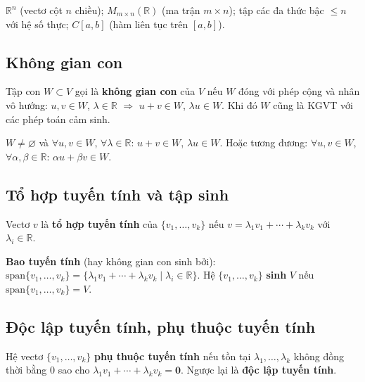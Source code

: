 \documentclass[12pt,a4paper]{article}
\begin{document}
\begin{vidu}
  $\mathbb{R}^n$ (vectơ cột $n$ chiều); $M_{m \times n}(\mathbb{R})$ (ma trận $m \times n$); tập các đa thức bậc $\le n$ với hệ số thực; $C[a,b]$ (hàm liên tục trên $[a,b]$).
\end{vidu}

\subsection{Không gian con}

\begin{dinhnghia}
  Tập con $W \subset V$ gọi là \textbf{không gian con} của $V$ nếu $W$ đóng với phép cộng và nhân vô hướng: $u, v \in W$, $\lambda \in \mathbb{R}$ $\Rightarrow$ $u + v \in W$, $\lambda u \in W$. Khi đó $W$ cũng là KGVT với các phép toán cảm sinh.
\end{dinhnghia}

\begin{phuongphap}[title={Kiểm tra không gian con}]
  $W \ne \varnothing$ và $\forall u, v \in W$, $\forall \lambda \in \mathbb{R}$: $u + v \in W$, $\lambda u \in W$. Hoặc tương đương: $\forall u, v \in W$, $\forall \alpha, \beta \in \mathbb{R}$: $\alpha u + \beta v \in W$.
\end{phuongphap}

\subsection{Tổ hợp tuyến tính và tập sinh}

\begin{dinhnghia}
  Vectơ $v$ là \textbf{tổ hợp tuyến tính} của $\{v_1, \ldots, v_k\}$ nếu $v = \lambda_1 v_1 + \cdots + \lambda_k v_k$ với $\lambda_i \in \mathbb{R}$.
\end{dinhnghia}

\begin{dinhnghia}
  \textbf{Bao tuyến tính} (hay không gian con sinh bởi): $\mathrm{span}\{v_1, \ldots, v_k\} = \{\lambda_1 v_1 + \cdots + \lambda_k v_k \mid \lambda_i \in \mathbb{R}\}$. Hệ $\{v_1, \ldots, v_k\}$ \textbf{sinh} $V$ nếu $\mathrm{span}\{v_1, \ldots, v_k\} = V$.
\end{dinhnghia}

\subsection{Độc lập tuyến tính, phụ thuộc tuyến tính}

\begin{dinhnghia}
  Hệ vectơ $\{v_1, \ldots, v_k\}$ \textbf{phụ thuộc tuyến tính} nếu tồn tại $\lambda_1, \ldots, \lambda_k$ không đồng thời bằng 0 sao cho $\lambda_1 v_1 + \cdots + \lambda_k v_k = \mathbf{0}$. Ngược lại là \textbf{độc lập tuyến tính}.
\end{dinhnghia}
\end{document}
